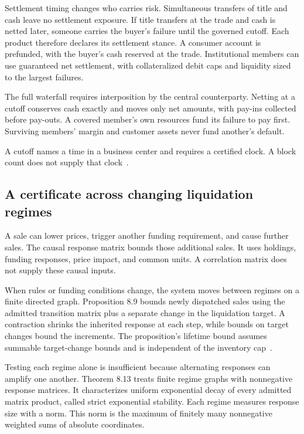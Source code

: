 \documentclass{momentum}
\begin{document}
Settlement timing changes who carries risk. Simultaneous transfers of title and cash leave no settlement exposure. If title transfers at the trade and cash is netted later, someone carries the buyer's failure until the governed cutoff. Each product therefore declares its settlement stance. A consumer account is prefunded, with the buyer's cash reserved at the trade. Institutional members can use guaranteed net settlement, with collateralized debit caps and liquidity sized to the largest failures.

The full waterfall requires interposition by the central counterparty. Netting at a cutoff conserves cash exactly and moves only net amounts, with pay-ins collected before pay-outs. A covered member's own resources fund its failure to pay first. Surviving members' margin and customer assets never fund another's default.

A cutoff names a time in a business center and requires a certified clock. A block count does not supply that clock~\cite[\S6]{ccp}.

\subsection{A certificate across changing liquidation regimes}

A sale can lower prices, trigger another funding requirement, and cause further sales. The causal response matrix bounds those additional sales. It uses holdings, funding responses, price impact, and common units. A correlation matrix does not supply these causal inputs.

When rules or funding conditions change, the system moves between regimes on a finite directed graph. Proposition 8.9 bounds newly dispatched sales using the admitted transition matrix plus a separate change in the liquidation target. A contraction shrinks the inherited response at each step, while bounds on target changes bound the increments. The proposition's lifetime bound assumes summable target-change bounds and is independent of the inventory cap~\cite[\S8.2]{ccp}.

Testing each regime alone is insufficient because alternating responses can amplify one another. Theorem 8.13 treats finite regime graphs with nonnegative response matrices. It characterizes uniform exponential decay of every admitted matrix product, called strict exponential stability. Each regime measures response size with a norm. This norm is the maximum of finitely many nonnegative weighted sums of absolute coordinates.
\end{document}
